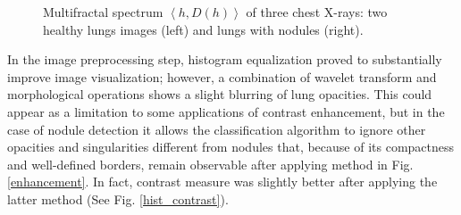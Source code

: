 \documentclass{article}
\begin{document}
\begin{figure}[ht]
	\centering
	\caption{Multifractal spectrum $\left\langle h, D(h)\right\rangle $ of three chest X-rays: two healthy lungs images (left) and lungs with nodules (right).} \label{visual_inspection}
\end{figure}


In the image preprocessing step, histogram equalization proved to substantially improve image visualization; however, a combination of wavelet transform and morphological operations shows a slight blurring of lung opacities.  This could appear as a limitation to some applications of contrast enhancement, but in the case of nodule detection it allows the classification algorithm to ignore other opacities and singularities different from nodules that, because of its compactness and well-defined borders, remain observable after applying method in Fig. \ref{enhancement}. In fact, contrast measure was slightly better after applying the latter method (See Fig. \ref{hist_contrast}). 
\end{document}
